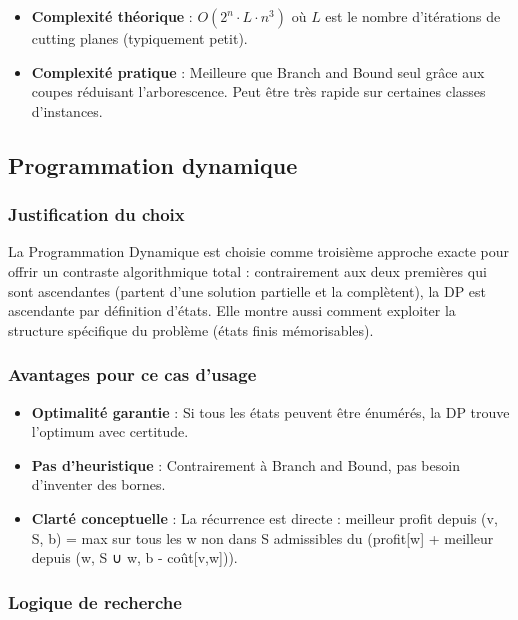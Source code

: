 \documentclass[11pt,a4paper]{article}
\begin{document}
\begin{itemize}
    \item \textbf{Complexité théorique} : $O(2^n \cdot L \cdot n^3)$ où $L$ est le nombre d'itérations de cutting planes (typiquement petit).
    \item \textbf{Complexité pratique} : Meilleure que Branch and Bound seul grâce aux coupes réduisant l'arborescence. Peut être très rapide sur certaines classes d'instances.
\end{itemize}


\subsection{Programmation dynamique}

\subsubsection*{Justification du choix}

La Programmation Dynamique est choisie comme troisième approche exacte pour offrir un contraste algorithmique total : contrairement aux deux premières qui sont ascendantes (partent d'une solution partielle et la complètent), la DP est ascendante par définition d'états. Elle montre aussi comment exploiter la structure spécifique du problème (états finis mémorisables).

\subsubsection*{Avantages pour ce cas d'usage}

\begin{itemize}
    \item \textbf{Optimalité garantie} : Si tous les états peuvent être énumérés, la DP trouve l'optimum avec certitude.
    \item \textbf{Pas d'heuristique} : Contrairement à Branch and Bound, pas besoin d'inventer des bornes.
    \item \textbf{Clarté conceptuelle} : La récurrence est directe : meilleur profit depuis (v, S, b) = max sur tous les w non dans S admissibles du (profit[w] + meilleur depuis (w, S ∪ {w}, b - coût[v,w])).
\end{itemize}

\subsubsection*{Logique de recherche}
\end{document}
